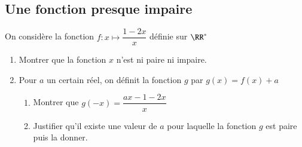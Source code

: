 \documentclass[oneside,12pt]{article}          			%
\begin{document}
\subsection{Une fonction presque impaire}
On considère la fonction $f:x\mapsto \dfrac{1-2x}{x}$ définie sur $\RR^*$
\begin{enumerate}
	\item Montrer que la fonction $x$ n'est ni paire ni impaire.
	\item Pour $a$ un certain réel, on définit la fonction $g$ par $g(x)=f(x)+a$
	\begin{enumerate}
		\item Montrer que $g(-x)=\dfrac{ax-1-2x}{x}$
		\item Justifier qu'il existe une valeur de $a$ pour laquelle la fonction $g$ est paire puis la donner.
	\end{enumerate}
\end{enumerate}
\end{document}
